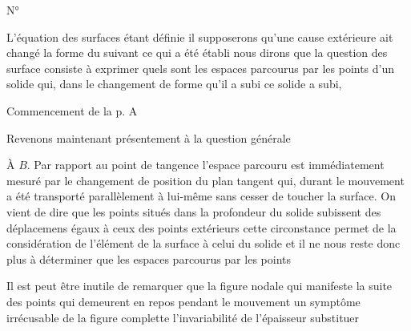 \documentclass[11pt,a4paper]{article}
\begin{document}
N° \struck{\ill{}}

L'équation des surfaces étant définie il 
\ill{} supposerons qu'une cause extérieure ait changé la forme du
suivant ce qui a été établi nous dirons que la 
question des surface consiste à exprimer quels sont les espaces
parcourus par les points d'un solide  qui, dans le changement de forme qu'il a subi ce
solide a subi, 

Commencement de la p. A

 

Revenons maintenant présentement à la question générale

À $B$. Par rapport au point de tangence l'espace parcouru est
immédiatement mesuré par le changement de position du plan tangent
qui, durant le mouvement a été transporté parallèlement à lui-même
sans cesser de toucher la surface. On vient de dire que les points
situés dans la profondeur du solide subissent des déplacemens égaux à
ceux des points extérieurs cette circonstance permet de
 la considération de l'élément de la surface à
celui du solide et il ne nous reste donc plus à déterminer que les
espaces parcourus par les points

Il est peut être inutile de remarquer que la figure nodale qui
manifeste la suite des points qui demeurent en repos pendant le
mouvement \ill{} un symptôme irrécusable de la figure complette
\ill{} l'invariabilité de l'épaisseur \ill{} substituer
\end{document}
